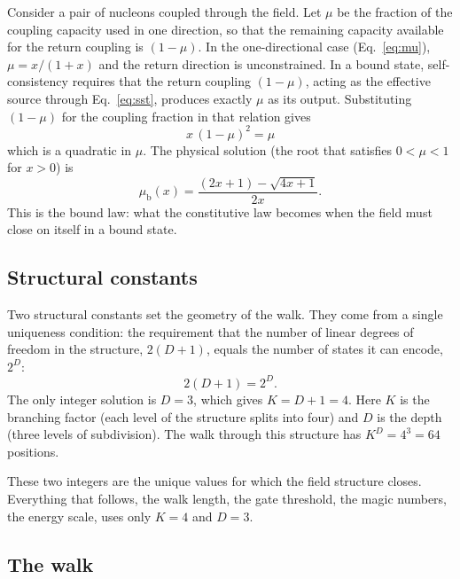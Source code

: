 \documentclass[fleqn,usenatbib]{mnras}
\begin{document}
Consider a pair of nucleons coupled through the field. Let $\mu$ be the fraction of the coupling capacity used in one direction, so that the remaining capacity available for the return coupling is $(1 - \mu)$. In the one-directional case (Eq.~\ref{eq:mu}), $\mu = x/(1+x)$ and the return direction is unconstrained. In a bound state, self-consistency requires that the return coupling $(1 - \mu)$, acting as the effective source through Eq.~\ref{eq:sst}, produces exactly $\mu$ as its output. Substituting $(1-\mu)$ for the coupling fraction in that relation gives
\begin{equation}
x\,(1 - \mu)^2 = \mu
\label{eq:selfconsistent}
\end{equation}
which is a quadratic in $\mu$. The physical solution (the root that satisfies $0 < \mu < 1$ for $x > 0$) is
\begin{equation}
\mu_{\mathrm{b}}(x) = \frac{(2x+1) - \sqrt{4x+1}}{2x}.
\label{eq:musst}
\end{equation}
This is the bound law: what the constitutive law becomes when the field must close on itself in a bound state.

\subsection{Structural constants}
\label{sec:constants}

Two structural constants set the geometry of the walk. They come from a single uniqueness condition: the requirement that the number of linear degrees of freedom in the structure, $2(D+1)$, equals the number of states it can encode, $2^D$:
\begin{equation}
2(D+1) = 2^D.
\label{eq:uniqueness}
\end{equation}
The only integer solution is $D = 3$, which gives $K = D + 1 = 4$. Here $K$ is the branching factor (each level of the structure splits into four) and $D$ is the depth (three levels of subdivision). The walk through this structure has $K^D = 4^3 = 64$ positions.

These two integers are the unique values for which the field structure closes. Everything that follows, the walk length, the gate threshold, the magic numbers, the energy scale, uses only $K\!=\!4$ and $D\!=\!3$.

\subsection{The walk}
\label{sec:walk}
\end{document}
